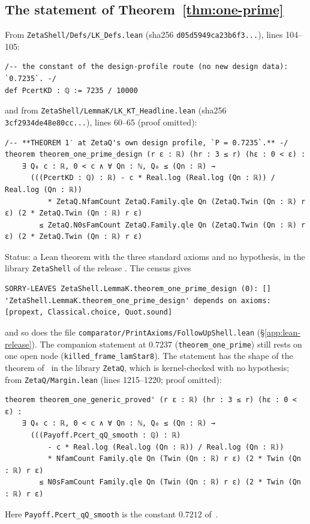 \subsection{The statement of Theorem~\ref{thm:one-prime}}
From \texttt{ZetaShell/Defs/LK\_Defs.lean} (sha256 \texttt{d05d5949ca23b6f3...}), lines 104--105:
\begin{Verbatim}[fontsize=\footnotesize,breaklines,frame=single,framesep=2mm]
/-- the constant of the design-profile route (no new design data): `0.7235`. -/
def PcertKD : ℚ := 7235 / 10000
\end{Verbatim}
and from \texttt{ZetaShell/LemmaK/LK\_KT\_Headline.lean} (sha256 \texttt{3cf2934de48e80cc...}), lines 60--65 (proof omitted):
\begin{Verbatim}[fontsize=\footnotesize,breaklines,frame=single,framesep=2mm]
/-- **THEOREM 1′ at ZetaQ's own design profile, `P = 0.7235`.** -/
theorem theorem_one_prime_design (r ε : ℝ) (hr : 3 ≤ r) (hε : 0 < ε) :
    ∃ Q₀ c : ℝ, 0 < c ∧ ∀ Qn : ℕ, Q₀ ≤ (Qn : ℝ) →
      (((PcertKD : ℚ) : ℝ) - c * Real.log (Real.log (Qn : ℝ)) / Real.log (Qn : ℝ))
          * ZetaQ.NfamCount ZetaQ.Family.qle Qn (ZetaQ.Twin (Qn : ℝ) r ε) (2 * ZetaQ.Twin (Qn : ℝ) r ε)
        ≤ ZetaQ.N0sFamCount ZetaQ.Family.qle Qn (ZetaQ.Twin (Qn : ℝ) r ε) (2 * ZetaQ.Twin (Qn : ℝ) r ε)
\end{Verbatim}
Status: a Lean theorem with the three standard axioms and no hypothesis, in the library \texttt{ZetaShell} of the release \tagL. The census
gives
\begin{Verbatim}[fontsize=\footnotesize,breaklines,frame=single,framesep=2mm]
SORRY-LEAVES ZetaShell.LemmaK.theorem_one_prime_design (0): []
'ZetaShell.LemmaK.theorem_one_prime_design' depends on axioms: [propext, Classical.choice, Quot.sound]
\end{Verbatim}
and so does the file \texttt{comparator/PrintAxioms/FollowUpShell.lean} (\S\ref{app:lean-release}). The companion statement at $0.7237$
(\texttt{theorem\_one\_prime}) still rests on one open node (\texttt{killed\_frame\_lamStar8}). The statement has the shape of the theorem of~\cite{DSouza} in the library
\texttt{ZetaQ}, which is kernel-checked with no hypothesis; from \texttt{ZetaQ/Margin.lean} (lines 1215--1220; proof omitted):
\begin{Verbatim}[fontsize=\footnotesize,breaklines,frame=single,framesep=2mm]
theorem theorem_one_generic_proved' (r ε : ℝ) (hr : 3 ≤ r) (hε : 0 < ε) :
    ∃ Q₀ c : ℝ, 0 < c ∧ ∀ Qn : ℕ, Q₀ ≤ (Qn : ℝ) →
      (((Payoff.Pcert_qQ_smooth : ℚ) : ℝ)
          - c * Real.log (Real.log (Qn : ℝ)) / Real.log (Qn : ℝ))
          * NfamCount Family.qle Qn (Twin (Qn : ℝ) r ε) (2 * Twin (Qn : ℝ) r ε)
        ≤ N0sFamCount Family.qle Qn (Twin (Qn : ℝ) r ε) (2 * Twin (Qn : ℝ) r ε)
\end{Verbatim}
Here \texttt{Payoff.Pcert\_qQ\_smooth} is the constant $0.7212$ of~\cite{DSouza}.

